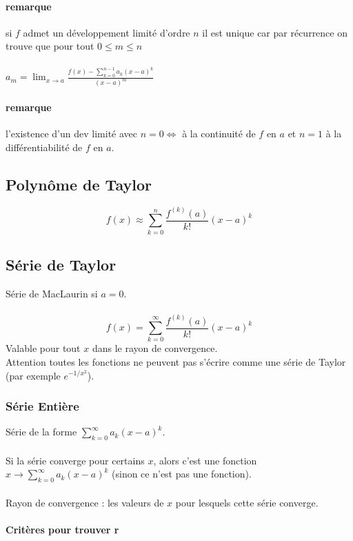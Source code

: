 \documentclass{article}
\begin{document}
\paragraph{remarque} si $ f $ admet un développement limité d'ordre $ n $ il est unique car par récurrence on trouve que pour tout $ 0 \leq m \leq n $\\\\
$a_m = \lim_{x\to{a}} \frac{f(x) - \sum_{k=0}^{n-1} a_k(x-a)^k}{(x-a)^m}$

\paragraph{remarque} l'existence d'un dev limité avec $ n = 0 \Leftrightarrow $ à la continuité de $ f $ en $ a $ et $ n = 1 $ à la différentiabilité de $ f $ en $ a $. 

\subsection{Polynôme de Taylor}

\[ f(x) \approx \sum_{k=0}^n \frac{f^{(k)} (a)}{k!} (x-a)^k\]

\subsection{Série de Taylor}

Série de MacLaurin si $ a = 0 $.\\\\
\[ f(x) = \sum_{k=0}^{\infty} \frac{f^{(k)} (a)}{k!} (x-a)^k\]
Valable pour tout $ x $ dans le rayon de convergence.\\
Attention toutes les fonctions ne peuvent pas s'écrire comme une série de Taylor (par exemple $ e^{-1/x^2}$).

\subsubsection{Série Entière}

Série de la forme $ \sum_{k=0}^{\infty} a_k (x-a)^k $.\\\\
Si la série converge pour certains $ x $, alors c'est une fonction $ x \to \sum_{k=0}^{\infty} a_k(x-a)^k$ (sinon ce n'est pas une fonction).\\\\
Rayon de convergence : les valeurs de $ x $ pour lesquels cette série converge.

\paragraph{Critères pour trouver r}
\end{document}
